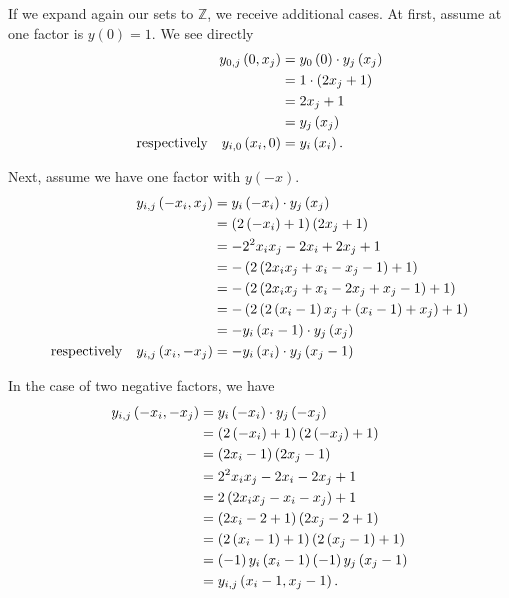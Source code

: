 If we expand again our sets to $\mathbb{Z}$, we receive additional cases. At first, assume at one factor is $y\left(0\right) = 1$. We see directly
\begin{alignat}{3}
	y_{0,j}\left(0,x_{j}\right) &= y_{0}\left(0\right) \cdot y_{j}\left(x_{j}\right) \notag \\
	&= 1 \cdot \left(2x_{j} + 1\right) \notag \\
	&= 2x_{j} + 1 \notag \\
	&= y_{j}\left(x_{j}\right) \\
	\mathrm{respectively} \quad y_{i,0}\left(x_{i},0\right) &= y_{i}\left(x_{i}\right).
\label{eq:onefactor1}
\end{alignat}

Next, assume we have one factor with $y\left(-x\right)$.
\begin{alignat}{3}
	y_{i,j}\left(-x_{i},x_{j}\right) & = y_{i}\left(-x_{i}\right) \cdot y_{j}\left(x_{j}\right) \notag \\
	&= \left(2\left(-x_{i}\right) + 1\right)\left(2x_{j} + 1\right) \notag \\
	&= -2^{2}x_{i}x_{j} - 2x_{i} + 2x_{j} + 1 \notag \\
	&= -\left(2\left(2x_{i}x_{j} + x_{i} - x_{j} - 1\right) + 1\right) \notag \\
	&= -\left(2\left(2x_{i}x_{j} + x_{i} - 2x_{j} + x_{j} -1\right) + 1\right) \notag \\
	&= -\left(2\left(2\left(x_{i} - 1\right)x_{j} + \left(x_{i} - 1\right) + x_{j}\right) + 1\right) \notag \\
	&= -y_{i}\left(x_{i} - 1\right) \cdot y_{j}\left(x_{j}\right) \\
	\mathrm{respectively} \quad y_{i,j}\left(x_{i},-x_{j}\right) &= -y_{i}\left(x_{i}\right) \cdot y_{j}\left(x_{j} - 1\right)
\label{eq:onefactorminus}
\end{alignat}

In the case of two negative factors, we have
\begin{alignat}{3}
	y_{i,j}\left(-x_{i},-x_{j}\right) &= y_{i}\left(-x_{i}\right) \cdot y_{j}\left(-x_{j}\right) \notag \\
	&= \left(2\left(-x_{i}\right) + 1\right)\left(2\left(-x_{j}\right) + 1\right) \notag \\
	&= \left(2x_{i} - 1\right)\left(2x_{j} - 1\right) \notag \\
	&= 2^{2}x_{i}x_{j} - 2x_{i} - 2x_{j} + 1 \notag \\
	&= 2\left(2x_{i}x_{j} - x_{i} - x_{j}\right) + 1 \notag \\
	&= \left(2x_{i} - 2 + 1\right)\left(2x_{j} - 2 + 1\right) \notag \\
	&= \left(2\left(x_{i} - 1\right) + 1\right)\left(2\left(x_{j} - 1\right) + 1\right) \notag \\
	&= \left(-1\right)y_{i}\left(x_{i} - 1\right)\left(-1\right)y_{j}\left(x_{j} - 1\right) \notag \\
	&= y_{i,j}\left(x_{i} - 1,x_{j} - 1\right).
\label{eq:twofactorminus}
\end{alignat}






